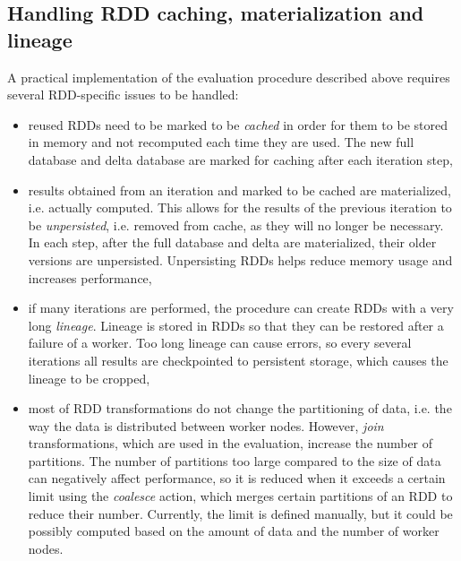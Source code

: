 \subsection{Handling RDD caching, materialization and lineage}
A practical implementation of the evaluation procedure described above requires several RDD-specific issues to be handled:
\begin{itemize}
\item reused RDDs need to be marked to be \emph{cached} in order for them to be stored in memory and not recomputed each time they are used. The new full database and delta database are marked for caching after each iteration step,
\item results obtained from an iteration and marked to be cached are materialized, i.e. actually computed. This allows for the results of the previous iteration to be \emph{unpersisted}, i.e. removed from cache, as they will no longer be necessary. In each step, after the full database and delta are materialized, their older versions are unpersisted. Unpersisting RDDs helps reduce memory usage and increases performance,
\item if many iterations are performed, the procedure can create RDDs with a very long \emph{lineage}. Lineage is stored in RDDs so that they can be restored after a failure of a worker. Too long lineage can cause errors, so every several iterations all results are checkpointed to persistent storage, which causes the lineage to be cropped,
\item most of RDD transformations do not change the partitioning of data, i.e. the way the data is distributed between worker nodes. However, \emph{join} transformations, which are used in the evaluation, increase the number of partitions. The number of partitions too large compared to the size of data can negatively affect performance, so it is reduced when it exceeds a certain limit using the \emph{coalesce} action, which merges certain partitions of an RDD to reduce their number. Currently, the limit is defined manually, but it could be possibly computed based on the amount of data and the number of worker nodes. 
\end{itemize}


